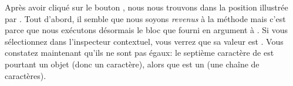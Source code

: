 \documentclass[a4paper,10pt,twoside]{book}
\begin{document}
Après avoir cliqué sur le bouton , 
nous nous trouvons dans la position illustrée par .
Tout d'abord, il semble que nous soyons \emph{revenus} à la méthode 
 mais c'est parce que nous exécutons désormais le bloc
que  fourni en argument à .
Si vous sélectionnez  dans l'inspecteur contextuel, 
vous verrez que sa valeur est .
Vous constatez maintenant qu'ils ne sont pas égaux: le septième caractère
de  est pourtant un objet  (donc un caractère), 
alors que  est un  (\ie une chaîne de caractères).
\end{document}
